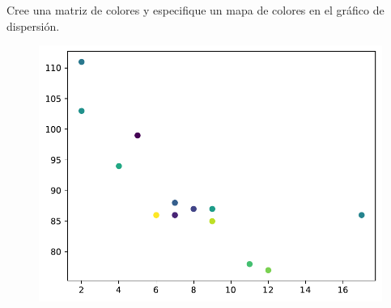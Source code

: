 \begin{code} Cree una matriz de colores y especifique un mapa de
colores en el gráfico de dispersión.

\begin{Shaded}
\begin{Highlighting}[]

\OperatorTok{=}\NormalTok{ np.array([}\NormalTok{,}\NormalTok{,}\NormalTok{,}\NormalTok{,}\NormalTok{,}\NormalTok{,}\NormalTok{,}\NormalTok{,}\NormalTok{,}\NormalTok{,}\NormalTok{,}\NormalTok{,}\NormalTok{])}
\OperatorTok{=}\NormalTok{ np.array([}\NormalTok{,}\NormalTok{,}\NormalTok{,}\NormalTok{,}\NormalTok{,}\NormalTok{,}\NormalTok{,}\NormalTok{,}\NormalTok{,}\NormalTok{,}\NormalTok{,}\NormalTok{,}\NormalTok{])}
\OperatorTok{=}\NormalTok{ np.array([}\NormalTok{, }\NormalTok{, }\NormalTok{, }\NormalTok{, }\NormalTok{, }\NormalTok{, }\NormalTok{, }\NormalTok{, }\NormalTok{, }\NormalTok{, }\NormalTok{, }\NormalTok{, }\NormalTok{])}

\OperatorTok{=}\OperatorTok{=}\NormalTok{)}

\end{Highlighting}
\end{Shaded}

\begin{figure}
  \centering
  \includegraphics[scale=0.6]{img/grafica1040.pdf}
\end{figure}
\end{code}

